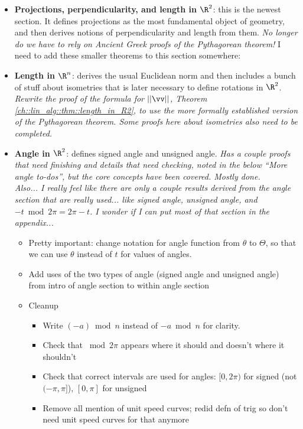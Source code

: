 \begin{itemize}
	\item \textbf{Projections, perpendicularity, and length in $\R^2$}: this is the newest section. It defines projections as the most fundamental object of geometry, and then derives notions of perpendicularity and length from them. \textit{No longer do we have to rely on Ancient Greek proofs of the Pythagorean theorem!} I need to add these smaller theorems to this section somewhere:
	\item \textbf{Length in $\R^n$}: derives the usual Euclidean norm and then includes a bunch of stuff about isometries that is later necessary to define rotations in $\R^2$. \textit{Rewrite the proof of the formula for $||\vv||$, Theorem \ref{ch::lin_alg::thm::length_in_R2}, to use the more formally established version of the Pythagorean theorem. Some proofs here about isometries also need to be completed.}
	\item \textbf{Angle in $\R^2$}: defines signed angle and unsigned angle. \textit{Has a couple proofs that need finishing and details that need checking, noted in the below ``More angle to-dos'', but the core concepts have been covered. Mostly done.} \\ \textit{Also... I really feel like there are only a couple results derived from the angle section that are really used... like signed angle, unsigned angle, and $-t \bmod 2\pi = 2\pi - t$. I wonder if I can put most of that section in the appendix...}
	\begin{itemize}
		\item Pretty important: change notation for angle function from $\theta$ to $\Theta$, so that we can use $\theta$ instead of $t$ for values of angles.
		\item Add uses of the two types of angle (signed angle and unsigned angle) from intro of angle section to within angle section
		\item Cleanup
		\begin{itemize}
			\item Write $(-a) \bmod n$ instead of $-a \bmod n$ for clarity.
			\item Check that $\bmod 2\pi$ appears where it should and doesn't where it shouldn't
			\item Check that correct intervals are used for angles: $[0, 2\pi)$ for signed (not $(-\pi, \pi]$), $[0, \pi]$ for unsigned
			\item Remove all mention of unit speed curves; redid defn of trig so don't need unit speed curves for that anymore

\end{itemize}
\end{itemize}
\end{itemize}
